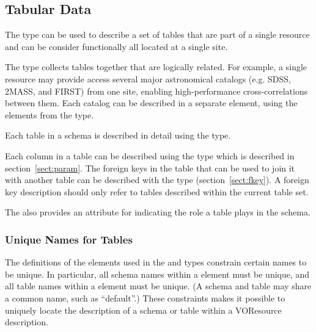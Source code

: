 \documentclass[11pt,a4paper]{ivoa}
\begin{document}
\subsection{Tabular Data}
\label{sect:table}


The  type can be used
to describe a set of tables that are part of a single resource and can
be consider functionally all located at a single site.





The  type collects
tables together that are logically related.  For example, a single
resource may provide access several major astronomical catalogs
(e.g. SDSS, 2MASS, and FIRST) from one site, enabling high-performance
cross-correlations between them.  Each catalog can be described in a
separate  element, using the elements from
the  type. 





Each table in a schema is described in detail using the
 type.







Each column in a table can be described using the
 type which is described in
section~\ref{sect:param}.  The foreign keys in the table that
can be used to join it with another table can be described with the
 type (section~\ref{sect:fkey}).
A foreign key description should only refer to tables described within
the current table set.  



The  also provides an attribute for indicating
the role a table plays in the schema.





\subsubsection{Unique Names for Tables}
\label{sect:unique}


The definitions of the  elements used in
the  and
 types
constrain certain names to be unique.  In particular, all schema names
within a  element must be unique, and all
table names within a  element must be
unique.  (A schema and table may share a common name, such as
``default''.)  These constraints makes it possible to uniquely locate
the description of a schema or table within a VOResource description.  
\end{document}
